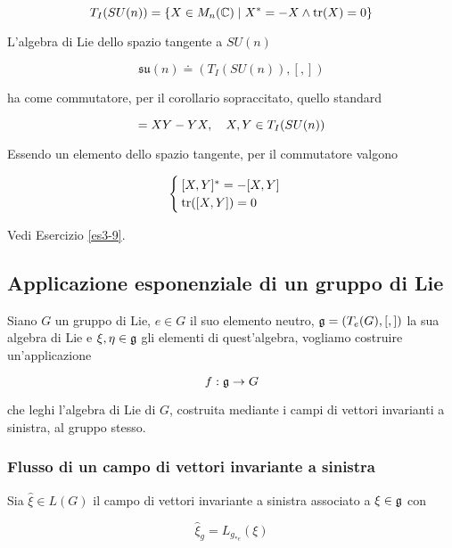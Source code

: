 \begin{equation}
	T_{I}(SU(n)) = \{ X \in M_{n}(\mathbb{C}) \mid X^{*} = -X \wedge \tr(X) = 0 \}
\end{equation}

L'algebra di Lie dello spazio tangente a $ SU(n) $

\begin{equation}
	\mathfrak{su}(n) \doteq (T_{I}(SU(n)),[,])
\end{equation}

ha come commutatore, per il corollario sopraccitato, quello standard

\begin{equation}
	[X,Y] = X Y - Y X \qcomma X,Y \in T_{I}(SU(n))
\end{equation}

Essendo un elemento dello spazio tangente, per il commutatore valgono

\begin{equation}
	\begin{cases}
		[X,Y]^{*} = - [X,Y]\\
		\tr([X,Y]) = 0
	\end{cases}
\end{equation}

Vedi Esercizio \ref{es3-9}.

\subsection{Applicazione esponenziale di un gruppo di Lie}

Siano $ G $ un gruppo di Lie, $ e \in G $ il suo elemento neutro, $ \mathfrak{g} = (T_{e}(G),[,]) $ la sua algebra di Lie e $ \xi,\eta \in \mathfrak{g} $ gli elementi di quest'algebra, vogliamo costruire un'applicazione

\begin{equation}
	f : \mathfrak{g} \to G
\end{equation}

che leghi l'algebra di Lie di $ G $, costruita mediante i campi di vettori invarianti a sinistra, al gruppo stesso.

\subsubsection{Flusso di un campo di vettori invariante a sinistra}

Sia $ \hat{\xi} \in L(G) $ il campo di vettori invariante a sinistra associato a $ \xi \in \mathfrak{g} $ con

\begin{equation}
	\hat{\xi}_{g} = L_{g_{*e}}(\xi)
\end{equation}

